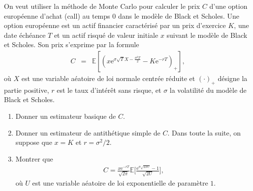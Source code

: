 \documentclass[11pt]{td_um}
\begin{document}
\begin{exo}{} %
    On veut utiliser la méthode de Monte Carlo pour calculer le prix $C$ d'une option européenne d'achat (call) au temps 0 dans le mod\`ele de Black et Scholes. Une option européenne est un actif financier caractérisé par un prix d'exercice $K$, une date échéance $T$ et un actif risqué de valeur initiale $x$ suivant le mod\`ele de Black et Scholes. Son prix s'exprime par la formule
    \begin{eqnarray*}
        C&=&\mathbb{E}\left[\left(x\mathrm{e}^{\sigma\sqrt{T}X-\frac{\sigma^2T}{2}}-K\mathrm{e}^{-rT}\right)_+\right],
    \end{eqnarray*}
    où $X$ est une variable aéatoire de loi normale centrée réduite et $(\cdot)_+$ désigne la partie positive,
    $r$ est le taux d'intérêt sans risque, et $\sigma$ la volatilité du modèle de Black et Scholes.
    \begin{enumerate}
        \item Donner un estimateur basique de $C$.
        \item Donner un estimateur de antithétique simple de $C$.
            Dans toute la suite, on suppose que $x=K$ et $r=\sigma^2/2$.
        \item  Montrer que
            \begin{align*}
                C=\frac{x\mathrm{e}^{-rT}}{\sqrt{2\pi}}\mathbb{E}\Big[\frac{\mathrm{e}^{\sigma\sqrt{2TU}}-1}{\sqrt{2U}}\Big],
            \end{align*}
            o\`u $U$ est une variable aéatoire de loi exponentielle de param\`etre $1$.


\end{enumerate}
\end{exo}
\end{document}
